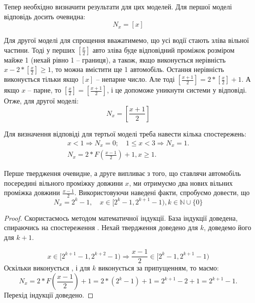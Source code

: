 Тепер необхідно визначити результати для цих моделей. Для першої моделі відповідь досить очевидна:
\begin{equation}
	\label{eq:upperbound}
	N_{x}=[x]
\end{equation}

Для другої моделі для спрощення вважатимемо, що усі водії стають зліва вільної частини. Тоді у перших $[\frac x2]$ авто зліва буде відповідний проміжок розміром майже 1 (нехай рівно 1 – границя), а також, якщо виконується нерівність $x - 2 * [\frac x2] \geq 1$, то можна вмістити ще 1 автомобіль. Остання нерівність виконується тільки якщо $[x]$ – непарне число. Але тоді $[\frac{x+1}{2}] = 2 * [\frac{x}{2}] + 1$. А якщо $x$ – парне, то $[\frac{x}{2}] = [\frac{x+1}{2}]$, і це допоможе уникнути системи у відповіді. Отже, для другої моделі:
\begin{equation}
	\label{eq:lowerbound}
	N_{x}=\left[\frac{x+1}{2}\right]
\end{equation}

Для визначення відповіді для тертьої моделі треба навести кілька спостережень:
\begin{gather}
	x < 1 \Rightarrow N_{x}=0;\quad 1 \leq x < 3 \Rightarrow N_{x} = 1.\label{eq:part_case_prop1}\\
	N_{x} = 2 * F\left(\frac{x-1}{2}\right) + 1, x \geq 1.\label{eq:part_case_prop2}
\end{gather}

Перше твердження очевидне, а друге випливає з того, що ставлячи автомобіль посередині вільного проміжку довжини $x$, ми отримуємо два
нових вільних проміжка довжини $\frac{x-1}{2}$. Використовуючи наведені факти,
спробуємо довести, що
\begin{equation}
	N_{x} = 2^k - 1,\quad x \in [2^k - 1, 2^{k+1} - 1), k \in \mathbb{N} \cup \{0\} \label{eq:part_case_res3}
\end{equation}

\begin{proof}
	Скористаємось методом математичної індукції. База індукції доведена, спираючись на спостереження . Нехай твердження доведено для $k$, доведемо його для $k+1$.
	
	\begin{equation}
		x \in [2^{k+1} - 1, 2^{k+2} - 1) \Rightarrow \frac{x-1}{2} \in [2^k - 1, 2^{k+1} - 1)
	\end{equation}
	Оскільки виконується , і для $k$ виконується  за припущенням, то маємо:
	\begin{equation}
		N_{x} = 2 * F\left(\frac{x-1}{2}\right) + 1 = 2 * (2^k - 1) + 1 = 2^{k+1} - 2 + 1 = 2^{k+1} - 1.
	\end{equation}
	Перехід індукції доведено.
\end{proof}
